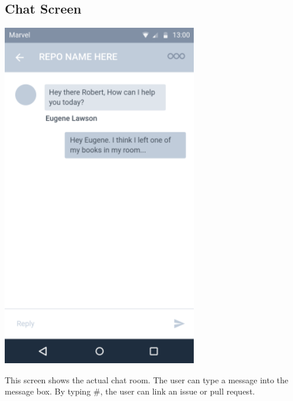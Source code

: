 \documentclass{report}
\begin{document}
\subsection{Chat Screen}
\begin{center}
    \includegraphics[scale=0.5]{design-chat}
\end{center}

This screen shows the actual chat room. The user can type a message into the message box. By typing \#, the user can link an issue or pull request.

\newpage
\end{document}
